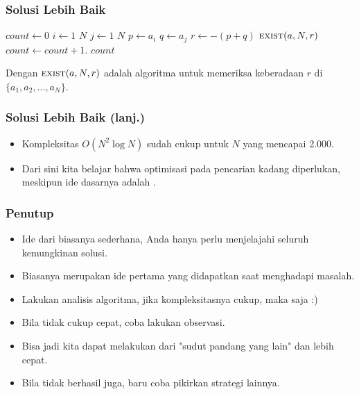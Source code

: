 \begin{frame}
\frametitle{Solusi Lebih Baik}
\begin{codebox}
\li $count \gets 0$
\li \For $i \gets 1$ \To $N$ \Do
\li   \For $j \gets 1$ \To $N$ \Do
\li       $p \gets a_i$
\li       $q \gets a_j$
\li       $r \gets -(p + q)$
\li       \If $\textnormal{\scshape exist}(a, N, r)$ \Then
\li         $count \gets count + 1$.
          \End
        \End
      \End
    \End
\li \Return $count$
\end{codebox}

Dengan $\textnormal{\scshape exist}(a, N, r)$ adalah algoritma \fBinarySearch untuk memeriksa keberadaan $r$ di $\{ a_1, a_2, ..., a_N \}$.
\end{frame}

\begin{frame}
\frametitle{Solusi Lebih Baik (lanj.)}
\begin{itemize}
  \item Kompleksitas $O(N^2 \log{N})$ sudah cukup untuk $N$ yang mencapai 2.000.
  \item Dari sini kita belajar bahwa optimisasi pada pencarian kadang diperlukan, meskipun ide dasarnya adalah \fBruteForce.
\end{itemize}
\end{frame}

\begin{frame}
\frametitle{Penutup}
\begin{itemize}
  \item Ide dari \fBruteForce biasanya sederhana, Anda hanya perlu menjelajahi seluruh kemungkinan solusi.
  \item Biasanya merupakan ide pertama yang didapatkan saat menghadapi masalah.
  \item Lakukan analisis algoritma, jika kompleksitasnya cukup, maka \fBruteForce saja :)
  \item Bila tidak cukup cepat, coba lakukan observasi. 
  \item Bisa jadi kita dapat melakukan \fBruteForce dari "sudut pandang yang lain" dan lebih cepat.
  \item Bila tidak berhasil juga, baru coba pikirkan strategi lainnya.
\end{itemize}
\end{frame}


